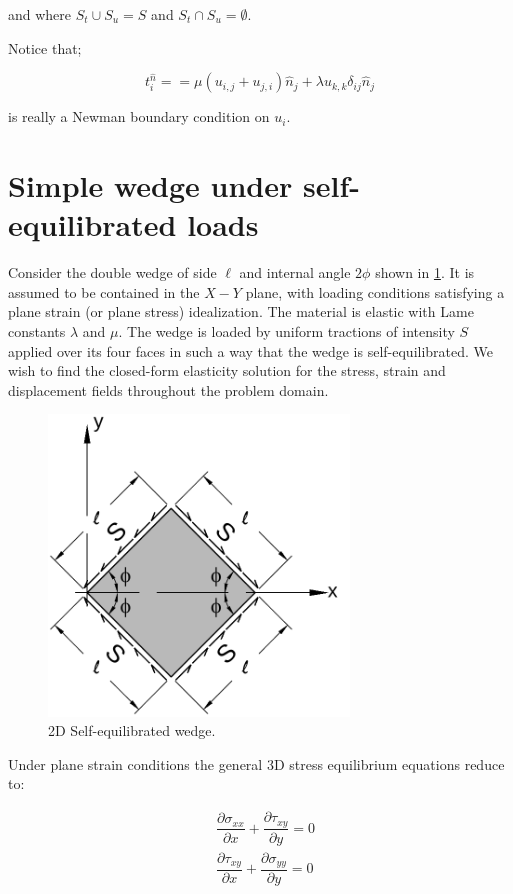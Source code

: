and where ${S_t} \cup {S_u} = S$ and ${S_t} \cap {S_u} = \emptyset $.  

Notice that;

\[t_i^{\hat n} =  = \mu \left( {{u_{i,j}} + {u_{j,i}}} \right){{\hat n}_j} + \lambda {u_{k,k}}{\delta _{ij}}{{\hat n}_j}\]

is really a Newman boundary condition on $u_i$.

\section*{Simple wedge under self-equilibrated loads}
Consider the double wedge of side $\ell$ and internal angle $2 \phi$ shown in \cref{WEDGE}. It is assumed to be contained in the $X-Y$ plane, with loading conditions satisfying a plane strain (or plane stress) idealization. The material is elastic with Lame constants $\lambda$ and $\mu$. The wedge is loaded by uniform tractions of intensity $S$ applied over its four faces in such a way that the wedge is self-equilibrated. We wish to find the closed-form elasticity solution for the stress, strain and displacement fields throughout the problem domain.

%
\begin{figure}[H]
\centering
\includegraphics[width=8cm]{img_src/wedge.pdf}
\caption{2D Self-equilibrated wedge.}
\label{WEDGE}
\end{figure}

Under plane strain conditions the general 3D stress equilibrium equations reduce to:

\begin{equation}
\begin{aligned}
&\dfrac{\partial\sigma_{xx}}{\partial x}+\dfrac{\partial\tau_{xy}}{\partial y}=0\\
&\dfrac{\partial\tau_{xy}}{\partial x}+\dfrac{\partial\sigma_{yy}}{\partial y}=0
\end{aligned}
\label{equlibrium}
\end{equation}

